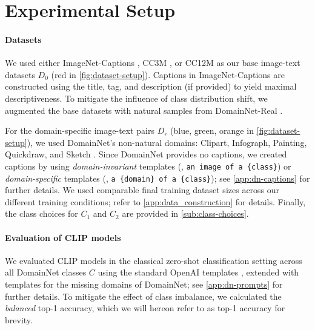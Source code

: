 \section{Experimental Setup}\label{sec:exp_setup}

\paragraph{Datasets}
We used either ImageNet-Captions \citep{fang2022data}, CC3M \citep{sharma2018conceptual}, or CC12M \citep{changpinyo2021conceptual} as our base image-text datasets $D_0$ (\textcolor{fig1red}{red} in \cref{fig:dataset-setup}).
Captions in ImageNet-Captions are constructed using the title, tag, and description (if provided) to yield maximal descriptiveness. To mitigate the influence of class distribution shift, we augmented the base datasets with natural samples from DomainNet-Real \citep{peng2019moment}.

For the domain-specific image-text pairs $D_r$ (\textcolor{fig1blue}{blue}, \textcolor{fig1green}{green}, \textcolor{fig1orange}{orange} in \cref{fig:dataset-setup}), we used DomainNet's non-natural domains: Clipart, Infograph, Painting, Quickdraw, and Sketch \citep{peng2019moment}. Since DomainNet provides no captions, we created captions by using \emph{domain-invariant} templates (\eg, \texttt{an image of a \{class\}}) or \emph{domain-specific} templates (\eg, \texttt{a \{domain\} of a \{class\}}); see \cref{app:dn-captions} for further details.
We used comparable final training dataset sizes across our different training conditions; refer to \cref{app:data_construction} for details. 
Finally, the class choices for $C_1$ and $C_2$ are provided in \cref{sub:class-choices}.

\paragraph{Evaluation of CLIP models}
We evaluated CLIP models in the classical zero-shot classification setting across all DomainNet classes $C$ using the standard OpenAI templates \citep{radford2021learning}, extended with templates for the missing domains of DomainNet; see \cref{app:dn-prompts} for further details. To mitigate the effect of class imbalance, we calculated the \emph{balanced} top-1 accuracy, which we will hereon refer to as top-1 accuracy for brevity.